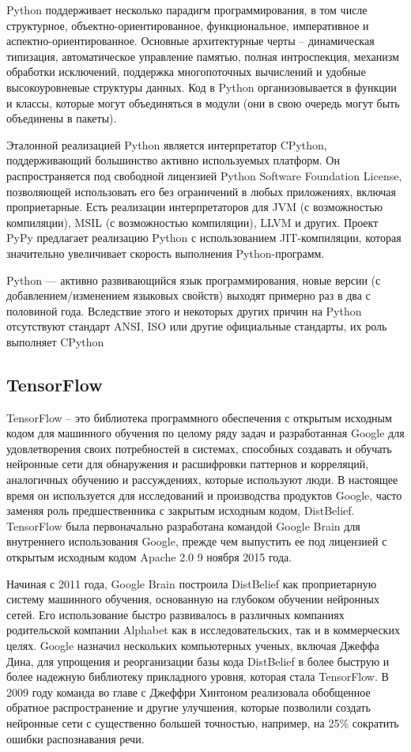 Python поддерживает несколько парадигм программирования, в том числе структурное, объектно-ориентированное, функциональное, императивное и аспектно-ориентированное. Основные архитектурные черты -- динамическая типизация, автоматическое управление памятью, полная интроспекция, механизм обработки исключений, поддержка многопоточных вычислений и удобные высокоуровневые структуры данных. Код в Python организовывается в функции и классы, которые могут объединяться в модули (они в свою очередь могут быть объединены в пакеты).

Эталонной реализацией Python является интерпретатор CPython, поддерживающий большинство активно используемых платформ. Он рас\-прос\-тра\-ня\-ет\-ся под свободной лицензией Python Software Foundation License, позволяющей использовать его без ограничений в любых приложениях, включая проприетарные. Есть реализации интерпретаторов для JVM (с возможностью компиляции), MSIL (с возможностью компиляции), LLVM и других. Проект PyPy предлагает реализацию Python с использованием JIT-компиляции, которая значительно увеличивает скорость выполнения Python-программ.

Python — активно развивающийся язык программирования, новые версии (с добавлением/изменением языковых свойств) выходят примерно раз в два с половиной года. Вследствие этого и некоторых других причин на Python отсутствуют стандарт ANSI, ISO или другие официальные стандарты, их роль выполняет CPython

\subsection{TensorFlow}
\label{sec:development:tensorflow}

TensorFlow -- это библиотека программного обеспечения с открытым исходным кодом для машинного обучения по целому ряду задач и разработанная Google для удовлетворения своих потребностей в системах, способных создавать и обучать нейронные сети для обнаружения и расшифровки паттернов и корреляций, аналогичных обучению и рассуждениях, которые используют люди. В настоящее время он используется для исследований и производства продуктов Google, часто заменяя роль предшественника с закрытым исходным кодом, DistBelief. TensorFlow была первоначально разработана командой Google Brain для внутреннего использования Google, прежде чем выпустить ее под лицензией с открытым исходным кодом Apache 2.0 9 ноября 2015 года.

Начиная с 2011 года, Google Brain построила DistBelief как проприетарную систему машинного обучения, основанную на глубоком обучении нейронных сетей. Его использование быстро развивалось в различных компаниях родительской компании Alphabet как в исследовательских, так и в коммерческих целях. Google назначил нескольких компьютерных ученых, включая Джеффа Дина, для упрощения и реорганизации базы кода DistBelief в более быструю и более надежную библиотеку прикладного уровня, которая стала TensorFlow. В 2009 году команда во главе с Джеффри Хинтоном реализовала обобщенное обратное распространение и другие улучшения, которые позволили создать нейронные сети с существенно большей точностью, например, на 25\% сократить ошибки распознавания речи.

